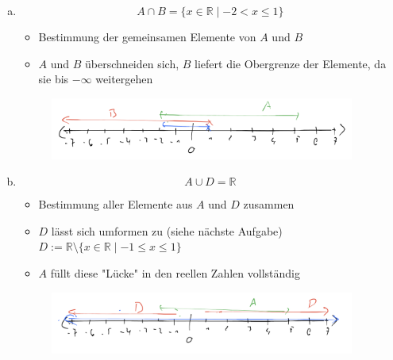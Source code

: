 \documentclass{standalone}
\begin{document}
\begin{enumerate}[a)]
    \item $$ A \cap B = \{x \in \mathbb{R} \mid -2 < x \leq 1\} $$
    \begin{itemize}
        \item Bestimmung der gemeinsamen Elemente von $A$ und $B$
        \item $A$ und $B$ überschneiden sich, $B$ liefert die Obergrenze der Elemente, da sie bis $-\infty$ weitergehen
    \end{itemize}
    \begin{figure}[htpb]
        \centering
        \includegraphics[width=10cm]{img/2_7_a}
    \end{figure}
    \FloatBarrier

    \item $$ A \cup D = \mathbb{R}$$
    \begin{itemize}
        \item Bestimmung aller Elemente aus $A$ und $D$ zusammen
        \item $D$ lässt sich umformen zu (siehe nächste Aufgabe) $D:= \mathbb{R} \setminus \{x \in \mathbb{R} \mid -1 \leq x \leq 1\}$
        \item $A$ füllt diese "Lücke" in den reellen Zahlen vollständig 
    \end{itemize}
    \begin{figure}[htpb]
        \centering
        \includegraphics[width=10cm]{img/2_7_b}
    \end{figure}
    \FloatBarrier


\end{enumerate}
\end{document}
